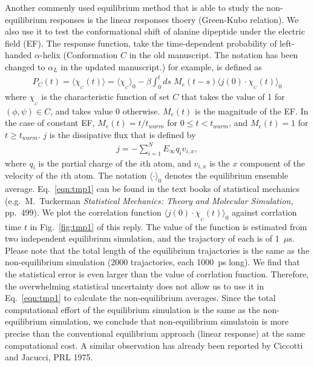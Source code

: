 \documentclass[]{revtex4-1}
\begin{document}
Another commenly used equilibrium method that is able to study the non-equilibrium
responses is the linear responses thoery (Green-Kubo relation).
We also use it to test the
conformational shift of alanine dipeptide under the electric field
(EF). The response function, take the time-dependent probability of
left-handed $\alpha$-helix (Conformation $C$ in the old manuscript. The notation has been changed to $\alpha_L$ in the updated manuscript.) for example, is defined as
\begin{align}\label{eqn:tmp1}
  P_C(t) = \langle\chi_{_C}(t)\rangle = \langle \chi_{_C} \rangle_0 -
  \beta \int_0^t ds\; M_e(t - s)\langle j(0)\cdot \chi_{_C}(t) \rangle_0
\end{align}
where $\chi_{_C}$ is the characteristic function of set $C$ that takes
the value of 1 for $(\phi,\psi)\in C$, and takes value 0
otherwise. $M_e(t)$ is the magnitude of the EF. In the case of
constant EF, $M_e(t) = t/t_{warm}$ for $0\leq t<t_{warm}$, and
$M_e(t) = 1$ for $t\geq t_{warm}$.
$j$ is the dissipative flux that is defined by
\begin{align}
  j = - \sum_{i=1}^N E_\infty q_i v_{i,x},
\end{align}
where $q_i$ is the partial charge of the $i$th atom, and $v_{i,x}$ is
the $x$ component of the velocity of the $i$th atom.  The notation
$\langle\cdot\rangle_0$ denotes the equilibrium ensemble average.
Eq.~\eqref{eqn:tmp1} can be found in the text books of statistical
mechanics (e.g.~M.~Tuckerman \emph{Statistical Mechanics: Theory and
  Molecular Simulation}, pp.~499).  We plot the correlation function
$\langle j(0)\cdot \chi_{_C}(t) \rangle_0$ against corrlation time $t$
in Fig.~\ref{fig:tmp1} of this reply. The value of the function is estimated from
two independent equilibrium simulation, and the trajactory of each is
of 1~$\mu$s. Please note that the total length of the equilibrium
trajactories is the same as the non-equilibrium simulation (2000
trajactories, each 1000~ps long).
We find that the statistical error is even larger than the value of
corrlation function.  Therefore, the
overwhelming statistical uncertainty does not allow us to use it 
in Eq.~\eqref{eqn:tmp1} to calculate the
non-equilibrium averages. 
Since the total computational effort of
the equilibrium simulation is the same as the non-equilibrium
simulation, we conclude that non-equilibrium simulatoin is more
precise than the conventional equilibrium approach (linear response) at the same computational cost.
A similar
observation has already been reported by Ciccotti and Jacucci, PRL
1975.
\\
\end{document}
